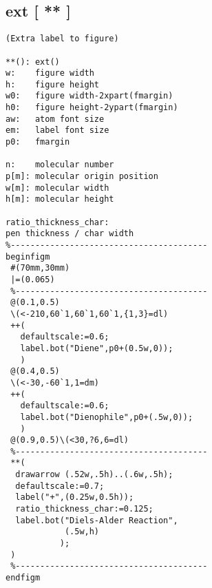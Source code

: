 \documentclass[a4paper]{article}
\begin{document}
\subsection{ext [ ** ]}
%
\index{**}%
%
%
%
%
%
%
%
\begin{verbatim}
(Extra label to figure)
 
**(): ext()
w:    figure width
h:    figure height
w0:   figure width-2xpart(fmargin)
h0:   figure height-2ypart(fmargin)
aw:   atom font size
em:   label font size
p0:   fmargin

n:    molecular number
p[m]: molecular origin position
w[m]: molecular width
h[m]: molecular height

ratio_thickness_char:
pen thickness / char width
%----------------------------------------
beginfigm
 #(70mm,30mm)
 |=(0.065)
 %---------------------------------------
 @(0.1,0.5)
 \(<-210,60`1,60`1,60`1,{1,3}=dl)
 ++(
   defaultscale:=0.6;
   label.bot("Diene",p0+(0.5w,0));
   )
 @(0.4,0.5)
 \(<-30,-60`1,1=dm)
 ++(
   defaultscale:=0.6;
   label.bot("Dienophile",p0+(.5w,0));
   )
 @(0.9,0.5)\(<30,?6,6=dl)
 %---------------------------------------
 **(
  drawarrow (.52w,.5h)..(.6w,.5h);
  defaultscale:=0.7;
  label("+",(0.25w,0.5h));
  ratio_thickness_char:=0.125;
  label.bot("Diels-Alder Reaction",
            (.5w,h)
           );
 )
 %---------------------------------------
endfigm
\end{verbatim}
\end{document}
